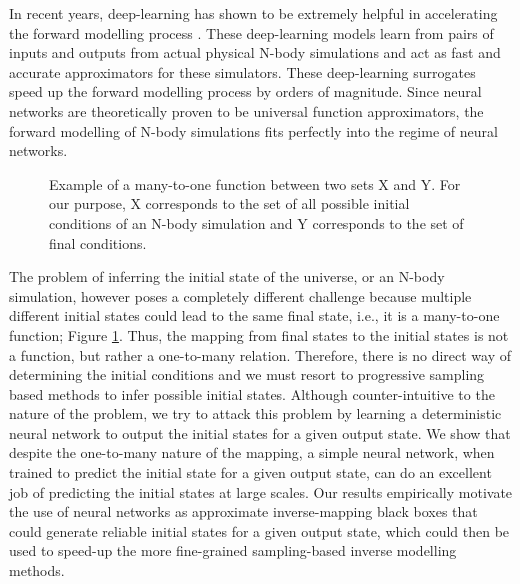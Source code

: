 \documentclass[11pt]{article}
\begin{document}
In recent years, deep-learning has shown to be extremely helpful in accelerating the forward modelling process \cite{he_li_feng_ho_ravanbakhsh_chen_póczos_2019}. These deep-learning models learn from pairs of inputs and outputs from actual physical N-body simulations and act as fast and accurate approximators for these simulators. These deep-learning surrogates speed up the forward modelling process by orders of magnitude. Since neural networks are theoretically proven to be universal function approximators, the forward modelling of N-body simulations fits perfectly into the regime of neural networks.
\begin{figure}[h!]
    \centering
    \caption{Example of a many-to-one function between two sets X and Y. For our purpose, X corresponds to the set of all possible initial conditions of an N-body simulation and Y corresponds to the set of final conditions.}
    \label{manytoone}
\end{figure}

The problem of inferring the initial state of the universe, or an N-body simulation, however poses a completely different challenge because multiple different initial states could lead to the same final state, i.e., it is a many-to-one function; Figure \ref{manytoone}. Thus, the mapping from final states to the initial states is not a function, but rather a one-to-many relation. Therefore, there is no direct way of determining the initial conditions and we must resort to progressive sampling based methods to infer possible initial states. Although counter-intuitive to the nature of the problem, we try to attack this problem by learning a deterministic neural network to output the initial states for a given output state. We show that despite the one-to-many nature of the mapping, a simple neural network, when trained to predict the initial state for a given output state, can do an excellent job of predicting the initial states at large scales. Our results empirically motivate the use of neural networks as approximate inverse-mapping black boxes that could generate reliable initial states for a given output state, which could then be used to speed-up the more fine-grained sampling-based inverse modelling methods.
\end{document}
